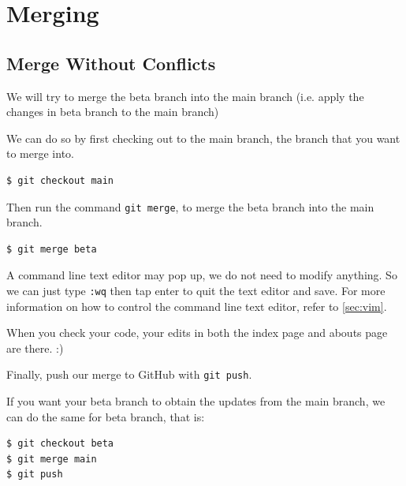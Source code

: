 \section{Merging}

\subsection{Merge Without Conflicts}

We will try to merge the beta branch into the main branch (i.e. apply the changes in beta branch to the main branch)

We can do so by first checking out to the main branch, the branch that you want to merge into.
\vspace{6mm}

\begin{lstlisting}[language=bash]
$ git checkout main
\end{lstlisting}

\vspace{6mm}
Then run the command \texttt{git merge}, to merge the beta branch into the main branch.

\vspace{6mm}\begin{lstlisting}[language=bash]
$ git merge beta
\end{lstlisting}
\vspace{6mm}

A command line text editor may pop up, we do not need to modify anything. So we can just type \texttt{:wq} then tap enter to quit the text editor and save. For more information on how to control the command line text editor, refer to \cref{sec:vim}.

When you check your code, your edits in both the index page and abouts page are there. :)

Finally, push our merge to GitHub with \texttt{git push}.
\vspace{6mm}

If you want your beta branch to obtain the updates from the main branch, we can do the same for beta branch, that is:
\vspace{6mm}

\begin{lstlisting}[language=bash]
$ git checkout beta
$ git merge main
$ git push
\end{lstlisting}

